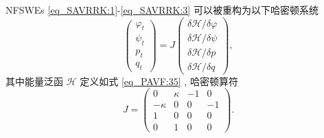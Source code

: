 \begin{theorem}\label{thm_PAVF:2}
	NFSWEs \eqref{eq_SAVRRK:1}-\eqref{eq_SAVRRK:3} 可以被重构为以下哈密顿系统
\begin{equation}\label{eq_PAVF:37}
	\left(\begin{array}{l}
		\varphi_{t} \\
		\psi_{t} \\
		p_{t} \\
		q_{t}
		\end{array}\right)=J\left(\begin{array}{l}
		\delta \mathcal{H} / \delta \varphi \\
		\delta \mathcal{H} / \delta \psi \\
		\delta \mathcal{H} / \delta p \\
		\delta \mathcal{H} / \delta q
		\end{array}\right) , 
\end{equation}
其中能量泛函 $\mathcal{H}$ 定义如式 \eqref{eq_PAVF:35} , 哈密顿算符
\begin{equation}\label{eq_PAVF:37b}
J=\left(\begin{array}{cccc}
		0 & \kappa & -1 & 0 \\
		-\kappa & 0 & 0 & -1 \\
		1 & 0 & 0 & 0 \\
		0 & 1 & 0 & 0
		\end{array}\right) . 
\end{equation}
\end{theorem}

